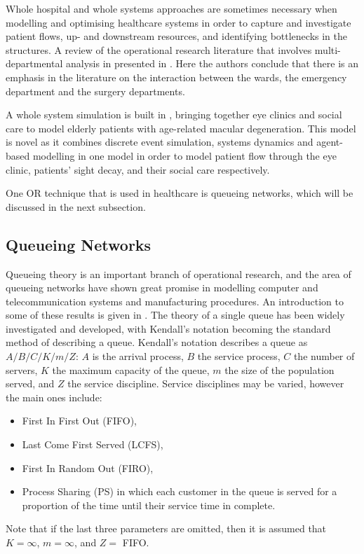 \documentclass{article}
\begin{document}
Whole hospital and whole systems approaches are sometimes necessary when modelling and optimising healthcare systems in order to capture and investigate patient flows, up- and downstream resources, and identifying bottlenecks in the structures.
A review of the operational research literature that involves multi-departmental analysis in presented in \cite{twente09}.
Here the authors conclude that there is an emphasis in the literature on the interaction between the wards, the emergency department and the surgery departments.

A whole system simulation is built in \cite{vianaetal12}, bringing together eye clinics and social care to model elderly patients with age-related macular degeneration.
This model is novel as it combines discrete event simulation, systems dynamics and agent-based modelling in one model in order to model patient flow through the eye clinic, patients' sight decay, and their social care respectively.

One OR technique that is used in healthcare is queueing networks, which will be discussed in the next subsection.

\subsection{Queueing Networks}

Queueing theory is an important branch of operational research, and the area of queueing networks have shown great promise in modelling computer and telecommunication systems and manufacturing procedures.
An introduction to some of these results is given in \cite{stewart09}.
The theory of a single queue has been widely investigated and developed, with Kendall's notation becoming the standard method of describing a queue.
Kendall's notation describes a queue as $A/B/C/K/m/Z$: $A$ is the arrival process, $B$ the service process, $C$ the number of servers, $K$ the maximum capacity of the queue, $m$ the size of the population served, and $Z$ the service discipline.
Service disciplines may be varied, however the main ones include:

\begin{itemize}
    \item First In First Out (FIFO),
    \item Last Come First Served (LCFS),
    \item First In Random Out (FIRO),
    \item Process Sharing (PS) in which each customer in the queue is served for a proportion of the time until their service time in complete.
\end{itemize}
Note that if the last three parameters are omitted, then it is assumed that $K = \infty$, $m = \infty$, and $Z =$ FIFO.
\end{document}
